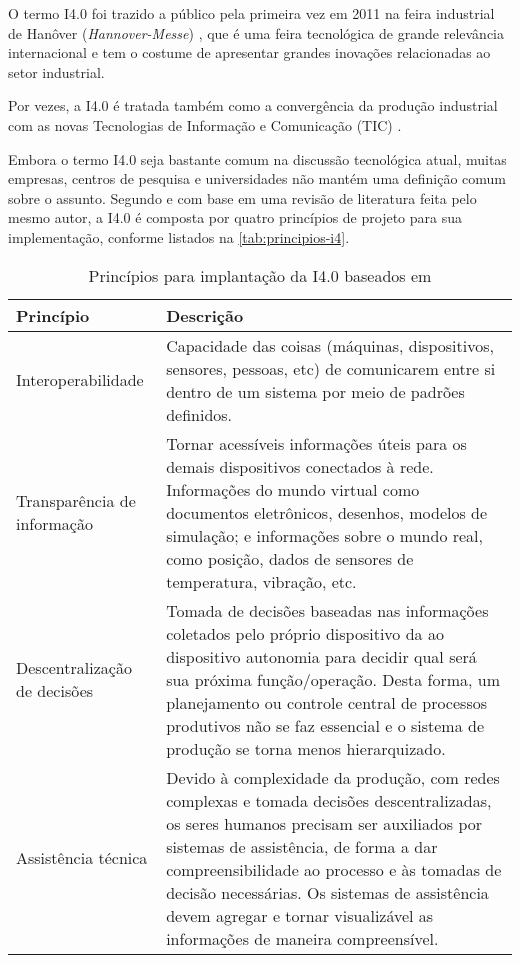 	O termo I4.0 foi trazido a público pela primeira vez em 2011 na feira industrial de Hanôver (\textit{Hannover-Messe}) \cite{kagermann2011industrie}, que é uma feira tecnológica de grande relevância internacional e tem o costume de apresentar grandes inovações relacionadas ao setor industrial.

	Por vezes, a I4.0 é tratada também como a convergência da produção industrial com as novas Tecnologias de Informação e Comunicação (TIC) \cite{hermann2016design}.
	
	Embora o termo I4.0 seja bastante comum na discussão tecnológica atual, muitas empresas, centros de pesquisa e universidades não mantém uma definição comum sobre o assunto. Segundo  e com base em uma revisão de literatura feita pelo mesmo autor, a I4.0 é composta por quatro princípios de projeto para sua implementação, conforme listados na \autoref{tab:principios-i4}.
	
	\begin{table}[htb]
		\centering
		\footnotesize
		\caption{Princípios para implantação da I4.0 baseados em }
		\label{tab:principios-i4}
		\begin{tabular}{p{3cm}p{12cm}}
			\hline
			\textbf{Princípio} & \textbf{Descrição} \\
			
			\hline
			Interoperabilidade &
			Capacidade das coisas (máquinas, dispositivos, sensores, pessoas, etc) de comunicarem entre si dentro de um sistema por meio de padrões definidos. \\
			
			\hline
			Transparência de informação &
			Tornar acessíveis informações úteis para os demais dispositivos conectados à rede. Informações do mundo virtual como documentos eletrônicos, desenhos, modelos de simulação; e informações sobre o mundo real, como posição, dados de sensores de temperatura, vibração, etc. \\
			
			\hline
			Descentralização de decisões &
			Tomada de decisões baseadas nas informações coletados pelo próprio dispositivo da ao dispositivo autonomia para decidir qual será sua próxima função/operação. Desta forma, um planejamento ou controle central de processos produtivos não se faz essencial e o sistema de produção se torna menos hierarquizado. \\
			
			\hline
			Assistência técnica &
			Devido à complexidade da produção, com redes complexas e tomada decisões descentralizadas, os seres humanos precisam ser auxiliados por sistemas de assistência, de forma a dar compreensibilidade ao processo e às tomadas de decisão necessárias. Os sistemas de assistência devem agregar e tornar visualizável as informações de maneira compreensível. \\
			
			\hline
		\end{tabular}
	\end{table}

